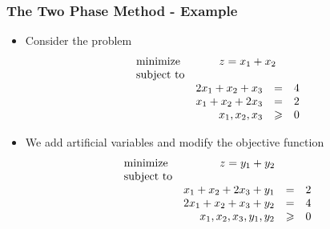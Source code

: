 \documentclass{beamer}
\theoremstyle{plain}
\let\ge\geqslant
\begin{document}
\begin{frame}\frametitle{The Two Phase Method - Example}
\justifying

\begin{itemize}
\justifying

\item Consider the problem
\[ \begin{array}{lrcr}
\textrm{minimize} & \multicolumn{3}{c}{z = x_1 + x_2}  \\
\textrm{subject to} & \\
& 2x_1 + x_2 + x_3 & = & 4 \\
& x_1 + x_2 + 2x_3 & = & 2 \\
& x_1, x_2, x_3 & \ge & 0
\end{array}
\]

\item We add artificial variables and modify the objective function
\[ \begin{array}{lrcr}
\textrm{minimize} & \multicolumn{3}{c}{z = y_1 + y_2}  \\
\textrm{subject to} & \\
& x_1 + x_2 + 2x_3 + y_1 & = & 2 \\
& 2x_1 + x_2 + x_3 + y_2 & = & 4 \\
& x_1, x_2, x_3, y_1, y_2 & \ge & 0
\end{array}
\]

\end{itemize}

\end{frame}
\end{document}
